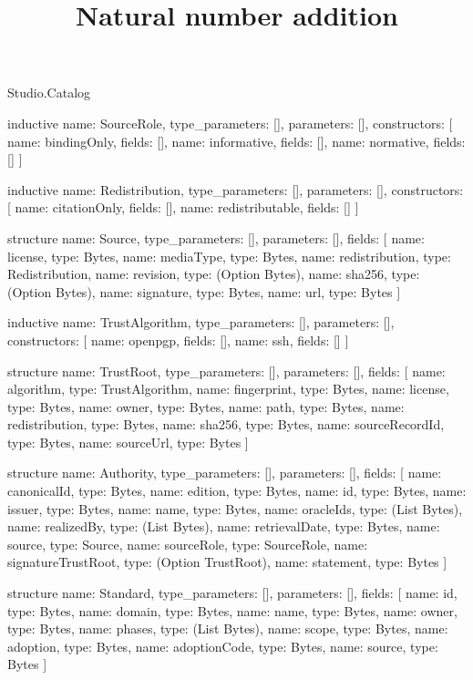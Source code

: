 \begin{lexlean}{Studio.Catalog}
\title{Natural number addition}
\begin{semanticmodule}
inductive{
  name: SourceRole,
  type_parameters: [],
  parameters: [],
  constructors: [
    {name: bindingOnly, fields: []},
    {name: informative, fields: []},
    {name: normative, fields: []}
  ]
}

inductive{
  name: Redistribution,
  type_parameters: [],
  parameters: [],
  constructors: [
    {name: citationOnly, fields: []},
    {name: redistributable, fields: []}
  ]
}

structure{
  name: Source,
  type_parameters: [],
  parameters: [],
  fields: [
    {name: license, type: Bytes},
    {name: mediaType, type: Bytes},
    {name: redistribution, type: Redistribution},
    {name: revision, type: (Option Bytes)},
    {name: sha256, type: (Option Bytes)},
    {name: signature, type: Bytes},
    {name: url, type: Bytes}
  ]
}

inductive{
  name: TrustAlgorithm,
  type_parameters: [],
  parameters: [],
  constructors: [
    {name: openpgp, fields: []},
    {name: ssh, fields: []}
  ]
}

structure{
  name: TrustRoot,
  type_parameters: [],
  parameters: [],
  fields: [
    {name: algorithm, type: TrustAlgorithm},
    {name: fingerprint, type: Bytes},
    {name: license, type: Bytes},
    {name: owner, type: Bytes},
    {name: path, type: Bytes},
    {name: redistribution, type: Bytes},
    {name: sha256, type: Bytes},
    {name: sourceRecordId, type: Bytes},
    {name: sourceUrl, type: Bytes}
  ]
}

structure{
  name: Authority,
  type_parameters: [],
  parameters: [],
  fields: [
    {name: canonicalId, type: Bytes},
    {name: edition, type: Bytes},
    {name: id, type: Bytes},
    {name: issuer, type: Bytes},
    {name: name, type: Bytes},
    {name: oracleIds, type: (List Bytes)},
    {name: realizedBy, type: (List Bytes)},
    {name: retrievalDate, type: Bytes},
    {name: source, type: Source},
    {name: sourceRole, type: SourceRole},
    {name: signatureTrustRoot, type: (Option TrustRoot)},
    {name: statement, type: Bytes}
  ]
}

structure{
  name: Standard,
  type_parameters: [],
  parameters: [],
  fields: [
    {name: id, type: Bytes},
    {name: domain, type: Bytes},
    {name: name, type: Bytes},
    {name: owner, type: Bytes},
    {name: phases, type: (List Bytes)},
    {name: scope, type: Bytes},
    {name: adoption, type: Bytes},
    {name: adoptionCode, type: Bytes},
    {name: source, type: Bytes}
  ]
}


\end{semanticmodule}
\end{lexlean}
